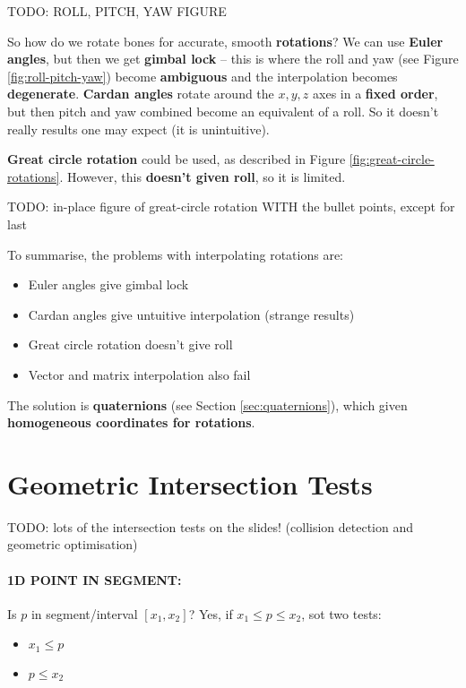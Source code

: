 \documentclass{article}
\begin{document}
TODO: ROLL, PITCH, YAW FIGURE

So how do we rotate bones for accurate, smooth \textbf{rotations}? We can use \textbf{Euler angles}, but then we get \textbf{gimbal lock} -- this is where the roll and yaw (see Figure \ref{fig:roll-pitch-yaw}) become \textbf{ambiguous} and the interpolation becomes \textbf{degenerate}. \textbf{Cardan angles} rotate around the $x,y,z$ axes in a \textbf{fixed order}, but then pitch and yaw combined become an equivalent of a roll. So it doesn't really results one may expect (it is unintuitive).

\textbf{Great circle rotation} could be used, as described in Figure \ref{fig:great-circle-rotations}. However, this \textbf{doesn't given roll}, so it is limited.

TODO: in-place figure of great-circle rotation WITH the bullet points, except for last

To summarise, the problems with interpolating rotations are:
\begin{itemize}
	\item Euler angles give gimbal lock
	\item Cardan angles give untuitive interpolation (strange results)
	\item Great circle rotation doesn't give roll
	\item Vector and matrix interpolation also fail
\end{itemize}
The solution is \textbf{quaternions} (see Section \ref{sec:quaternions}), which given \textbf{homogeneous coordinates for rotations}.

\section{Geometric Intersection Tests}
\label{sec:intersection-tests}

TODO: lots of the intersection tests on the slides! (collision detection and geometric optimisation)

\paragraph{{1D POINT IN SEGMENT: }} Is $p$ in segment/interval $[x_1,x_2]$? Yes, if $x_1 \leq p \leq x_2$, sot two tests:
\begin{itemize}
	\item $x_1 \leq p$
	\item $p \leq x_2$
\end{itemize}
\end{document}
